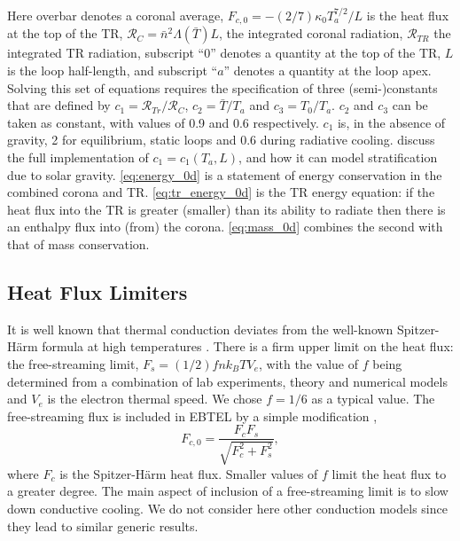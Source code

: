 \documentclass[apj]{emulateapj}
\begin{document}
Here overbar denotes a coronal average, $F_{c,0} = -(2/7)\kappa_0 T_a^{7/2}/L$ is the heat flux at the top of the TR, $\mathcal{R}_C=\bar{n}^2\Lambda(\bar{T})L$, the integrated coronal radiation, $\mathcal{R}_{TR}$ the integrated TR radiation, subscript ``0'' denotes a quantity at the top of the TR, $L$ is the loop half-length, and subscript ``$a$'' denotes a quantity at the loop apex. Solving this set of equations requires the specification of three (semi-)constants that are defined by  $c_1=\mathcal{R}_{Tr}/\mathcal{R}_C$, $c_2=\bar{T}/T_a$ and $c_3=T_0/T_a$. $c_2$ and $c_3$ can be taken as constant, with values of 0.9 and 0.6 respectively. $c_1$ is, in the absence of gravity, 2 for equilibrium, static loops and 0.6 during radiative cooling. \citet{cargill_enthalpy-based_2012} discuss the full implementation of $c_1 = c_1(T_a,L)$, and how it can model stratification due to solar gravity. \autoref{eq:energy_0d} is a statement of energy conservation in the combined corona and TR. \autoref{eq:tr_energy_0d} is the TR energy equation: if the heat flux into the TR is greater (smaller) than its ability to radiate then there is an enthalpy flux into (from) the corona. \autoref{eq:mass_0d} combines the second with that of mass conservation.
	
	\subsection{Heat Flux Limiters}
	\label{subsec:hf_theory}
	\par It is well known that thermal conduction deviates from the well-known Spitzer-H{\"a}rm formula \citep{spitzer_transport_1953} at high temperatures \citep{ljepojevic_heat_1989}. There is a firm upper limit on the heat flux: the free-streaming limit, $F_s=(1/2)fnk_BTV_e$,  with the value of $f$ being determined from a combination of lab experiments, theory and numerical models and $V_e$ is the electron thermal speed. We chose $f = 1/6$ as a typical value. The free-streaming flux is included in EBTEL by a simple modification \citep{klimchuk_highly_2008},
	\begin{equation}
		F_{c,0} = \frac{F_cF_s}{\sqrt{F_c^2 + F_s^2}},
	\end{equation}
where $F_c$ is the Spitzer-H{\"a}rm heat flux. Smaller values of $f$ limit the heat flux to a greater degree. The main aspect of inclusion of a free-streaming limit is to slow down conductive cooling. We do not consider here other conduction models \citep[e.g. the non-local model discussed in the coronal context by][]{karpen_nonlocal_1987,west_lifetime_2008} since they lead to similar generic results. 
\end{document}
